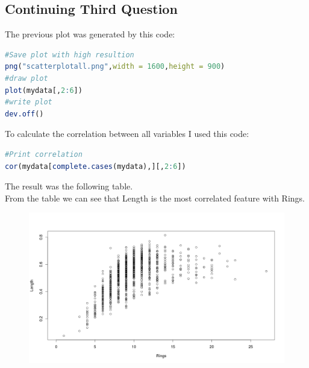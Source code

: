 \documentclass{article}
\begin{document}
\begin{multicols*}{2}
{\centering \section*{Continuing  Third Question}}
The previous plot was generated by this code:
\begin{lstlisting}[language=R]
#Save plot with high resultion
png("scatterplotall.png",width = 1600,height = 900)
#draw plot
plot(mydata[,2:6])
#write plot
dev.off()
\end{lstlisting}
To calculate the correlation between all variables I used this code: 
\begin{lstlisting}[language=R]
#Print correlation
cor(mydata[complete.cases(mydata),][,2:6])
\end{lstlisting}
The result was the following table.\\
From the table we can see that Length is the most correlated feature with Rings.
\begin{figure}[H]
	\begin{center}
		\includegraphics[scale=0.28]{scatterplotLengthRings.png}

\end{center}
\end{figure}
\end{multicols*}
\end{document}
